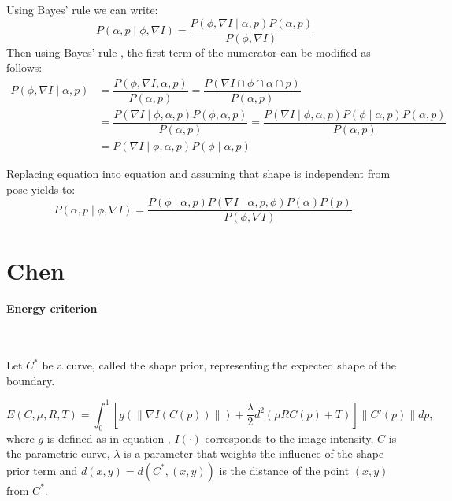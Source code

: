 Using Bayes' rule  we can write:
\begin{equation}
  \label{eq:sec-MAP-leventon1}
  P(\alpha, p \; | \; \phi, \nabla I) = \frac{P(\phi,\nabla I \; | \; \alpha, p)P(\alpha,p)}{P(\phi, \nabla I)}
\end{equation}
Then using Bayes' rule , the first term of the numerator can be modified as follows:
\begin{align}
  \label{eq:sec-MAP-leventon2}
  \nonumber P(\phi,\nabla I \; | \; \alpha, p) & = \dfrac{P(\phi,\nabla I,\alpha, p)}{P(\alpha,p)} = \dfrac{P(\nabla I \cap \phi \cap \alpha \cap p)}{P(\alpha,p)} \\
  \nonumber & = \dfrac{P(\nabla I \; | \; \phi,\alpha,p)P(\phi,\alpha,p)}{P(\alpha,p)} = \dfrac{P(\nabla I \; | \; \phi,\alpha,p)P(\phi \; | \; \alpha, p)P(\alpha,p)}{P(\alpha,p)} \\
  & = P(\nabla I \; | \; \phi,\alpha,p)P(\phi \; | \; \alpha, p)
\end{align}

Replacing equation  into equation  and assuming that shape is independent from pose yields to:
\begin{equation}
  \label{eq:sec-MAP-leventon3}
  P(\alpha, p \; | \; \phi, \nabla I) = \dfrac{P(\phi \; | \; \alpha,p)P(\nabla I \; | \; \alpha, p, \phi)P(\alpha)P(p)}{P(\phi,\nabla I)}.
\end{equation}


\newpage
\section[Chen \etal]{Chen \etal \cite{Chen2002}}
\label{sec:shape-chen}

\paragraph{Energy criterion}
~\par \vspace{0.3cm}
Let $C^\ast$ be a curve, called the shape prior, representing the expected shape of the boundary.

\begin{equation}
  \label{eq:NRJ-chen}
  E(C, \mu, R, T) = \int_0^1 \left[ g(\| \nabla I(C(p))\|) + \frac{\lambda}{2}d^2(\mu RC(p) +T) \right] \|C'(p)\|dp,
\end{equation}
where $g$ is defined as in equation , $I(\cdot)$ corresponds to the image intensity, $C$ is the parametric curve, $\lambda$ is a parameter that weights the influence of the shape prior term and $d(x, y) = d(C^\ast, (x, y))$ is the distance of the point $(x, y)$ from $C^\ast$.

